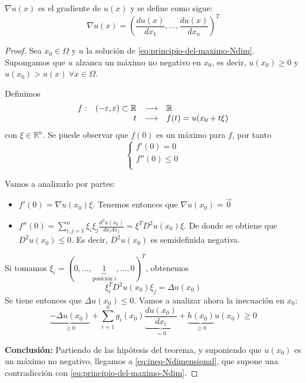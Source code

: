 $\nabla u(x)$ es el gradiente de $u(x)$ y se define como sigue:
$$\nabla u(x) = \left(\frac{du(x)}{dx_1}, \hdots, \frac{du(x)}{dx_n}\right)^T$$
\begin{proof}
Sea $x_0\in \Omega$ y $u$ la solución de \eqref{eq:principio-del-maximo-Ndim}. Supongamos que $u$ alzanca un máximo no negativo en $x_0$, es decir, $u(x_0) \ge 0$ y $u(x_0) > u(x)\ \forall x \in \Omega$.

Definimos 
\begin{equation*}
\begin{array}{l r l l}
f: & (-\varepsilon, \varepsilon) \subset\mathbb{R} & \longrightarrow  & \mathbb{R}\\
& t & \longrightarrow & f(t) = u(x_0+t\xi)\\
\end{array}
\end{equation*}
con $\xi\in\mathbb{R}^n$.
Se puede observar que $f(0)$ es un máximo para $f$, por tanto
\begin{equation}
\left\{
\begin{array}{l}
f'(0) = 0\\
f''(0) \le 0\\
\end{array}
\right.
\end{equation}

Vamos a analizarlo por partes:
\begin{itemize}
\item $f'(0) = \nabla u(x_0)\xi$. Tenemos entonces que $\nabla u(x_0) = \vec{0}$
\item $f''(0) = \sum_{i,j=1}^n \xi_i\xi_j\frac{d^2u(x_0)}{dx_idx_j} = \xi^TD^2u(x_0)\xi$. De donde se obtiene que $D^2u(x_0) \le 0$. Es decir, $D^2u(x_0)$ es semidefinida negativa.
\end{itemize}

Si tomamos $\xi_i = (0,\hdots, \underbrace{1}_{\text{posición i}}, \hdots, 0)^T$, obtenemos
$$\xi_i^TD^2u(x_0)\xi_j = \Delta u(x_0)$$
Se tiene entonces que $\Delta u(x_0) \leq 0$.
Vamos a analizar ahora la inecuación en $x_0$:
\begin{equation}\label{eq:ineq-Ndimensional}
\underbrace{-\Delta u(x_0)}_{\ge 0} + \sum_{i=1}^n g_i(x_0)\underbrace{\frac{du(x_0)}{dx_i}}_{=0}+\underbrace{h(x_0)}_{\ge 0}u(x_0) \ge 0
\end{equation}

\noindent\textbf{Conclusión:}
Partiendo de las hipótesis del teorema, y suponiendo que $u(x_0)$ es un máximo no negativo, llegamos a \eqref{eq:ineq-Ndimensional}, que supone una contradicción con \eqref{eq:principio-del-maximo-Ndim}.
\end{proof}

